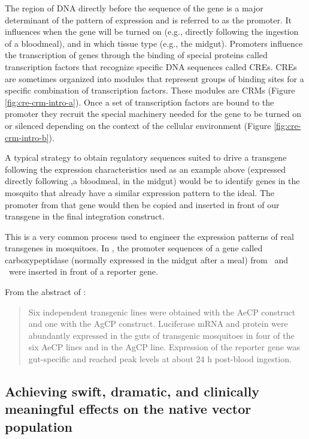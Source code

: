 The region of DNA directly before the sequence of the gene is a major determinant of the pattern of expression and is referred to as the promoter.
It influences when the gene will be turned on (e.g., directly following the ingestion of a bloodmeal), and in which tissue type (e.g., the midgut).
Promoters influence the transcription of genes through the binding of special proteins called transcription factors that recognize specific DNA sequences called \glspl{CRE}.
\glspl{CRE} are sometimes organized into modules that represent groups of binding sites for a specific combination of transcription factors.
These modules are \glspl{CRM} \CITEME (Figure \ref{fig:cre-crm-intro-a}).
Once a set of transcription factors are bound to the promoter they recruit the special machinery needed for the gene to be turned on or silenced depending on the context of the cellular environment (Figure \ref{fig:cre-crm-intro-b}).



A typical strategy to obtain regulatory sequences suited to drive a transgene following the expression characteristics used as an example above (expressed directly following ,a bloodmeal, in the midgut) would be to identify genes in the mosquito that already have a similar expression pattern to the ideal.
The promoter from that gene would then be copied and inserted in front of our transgene in the final integration construct.

This is a very common process used to engineer the expression patterns of real transgenes in mosquitoes.
In \cite{Moreira2000}, the promoter sequences of a gene called carboxypeptidase (normally expressed in the midgut after a meal) from \Aa\ and \Ag\ were inserted in front of a reporter gene.

From the abstract of \cite{Moreira2000}:

\begin{quote}
Six independent transgenic lines were obtained with the AeCP construct and one with the
AgCP
construct.
Luciferase mRNA and protein were abundantly expressed in the
guts of transgenic mosquitoes in four of the six AeCP lines and in the
AgCP line.
Expression of the reporter gene was gut-specific and reached
peak levels at about 24 h post-blood ingestion.
\end{quote}

\subsection{Achieving swift, dramatic, and clinically meaningful effects on the native vector population}

